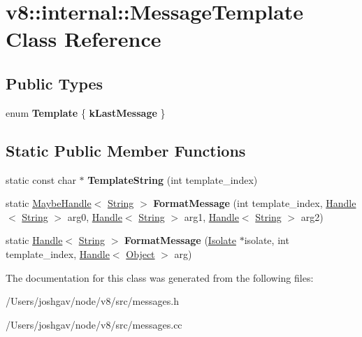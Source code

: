 \hypertarget{classv8_1_1internal_1_1_message_template}{}\section{v8\+:\+:internal\+:\+:Message\+Template Class Reference}
\label{classv8_1_1internal_1_1_message_template}
\subsection*{Public Types}
\begin{DoxyCompactItemize}
\item 
enum {\bfseries Template} \{ {\bfseries k\+Last\+Message}
 \}\hypertarget{classv8_1_1internal_1_1_message_template_a2744c9e0619c6c1b900d894e4ba61e83}{}\label{classv8_1_1internal_1_1_message_template_a2744c9e0619c6c1b900d894e4ba61e83}

\end{DoxyCompactItemize}
\subsection*{Static Public Member Functions}
\begin{DoxyCompactItemize}
\item 
static const char $\ast$ {\bfseries Template\+String} (int template\+\_\+index)\hypertarget{classv8_1_1internal_1_1_message_template_aa23014ab1a6a1dea16e20cfa896ebb39}{}\label{classv8_1_1internal_1_1_message_template_aa23014ab1a6a1dea16e20cfa896ebb39}

\item 
static \hyperlink{classv8_1_1internal_1_1_maybe_handle}{Maybe\+Handle}$<$ \hyperlink{classv8_1_1internal_1_1_string}{String} $>$ {\bfseries Format\+Message} (int template\+\_\+index, \hyperlink{classv8_1_1internal_1_1_handle}{Handle}$<$ \hyperlink{classv8_1_1internal_1_1_string}{String} $>$ arg0, \hyperlink{classv8_1_1internal_1_1_handle}{Handle}$<$ \hyperlink{classv8_1_1internal_1_1_string}{String} $>$ arg1, \hyperlink{classv8_1_1internal_1_1_handle}{Handle}$<$ \hyperlink{classv8_1_1internal_1_1_string}{String} $>$ arg2)\hypertarget{classv8_1_1internal_1_1_message_template_a6569401bfaa40ea22ef50b8ea99b58a1}{}\label{classv8_1_1internal_1_1_message_template_a6569401bfaa40ea22ef50b8ea99b58a1}

\item 
static \hyperlink{classv8_1_1internal_1_1_handle}{Handle}$<$ \hyperlink{classv8_1_1internal_1_1_string}{String} $>$ {\bfseries Format\+Message} (\hyperlink{classv8_1_1internal_1_1_isolate}{Isolate} $\ast$isolate, int template\+\_\+index, \hyperlink{classv8_1_1internal_1_1_handle}{Handle}$<$ \hyperlink{classv8_1_1internal_1_1_object}{Object} $>$ arg)\hypertarget{classv8_1_1internal_1_1_message_template_adbb7ac876a34fdc417e72792a5db84ed}{}\label{classv8_1_1internal_1_1_message_template_adbb7ac876a34fdc417e72792a5db84ed}

\end{DoxyCompactItemize}


The documentation for this class was generated from the following files\+:\begin{DoxyCompactItemize}
\item 
/\+Users/joshgav/node/v8/src/messages.\+h\item 
/\+Users/joshgav/node/v8/src/messages.\+cc\end{DoxyCompactItemize}
